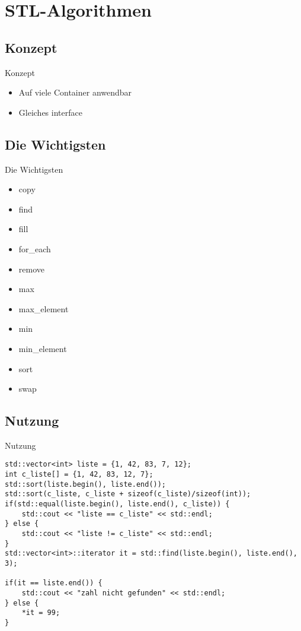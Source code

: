 \section{STL-Algorithmen}


\subsection{Konzept}

\begin{frame}{Konzept}
	\begin{itemize}
		\item Auf viele Container anwendbar
		\item Gleiches interface
	\end{itemize}
\end{frame}

\subsection{Die Wichtigsten}

\begin{frame}{Die Wichtigsten}
	\begin{itemize}
		\item copy
		\item find
		\item fill
		\item for_each
		\item remove
		\item max
		\item max_element
		\item min
		\item min_element
		\item sort
		\item swap
	\end{itemize}
\end{frame}

\subsection{Nutzung}

\begin{frame}[fragile]{Nutzung}
	
	\begin{lstlisting}[escapechar=\$]
std::vector<int> liste = {1, 42, 83, 7, 12};
int c_liste[] = {1, 42, 83, 12, 7};
std::sort(liste.begin(), liste.end());
std::sort(c_liste, c_liste + sizeof(c_liste)/sizeof(int));
if(std::equal(liste.begin(), liste.end(), c_liste)) {
	std::cout << "liste == c_liste" << std::endl;
} else {
	std::cout << "liste != c_liste" << std::endl;
}
std::vector<int>::iterator it = std::find(liste.begin(), liste.end(), 3);

if(it == liste.end()) {
	std::cout << "zahl nicht gefunden" << std::endl;
} else {
	*it = 99;
}
	\end{lstlisting}
	
\end{frame}
